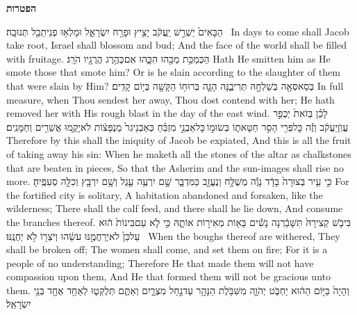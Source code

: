 \vspace{24pt}\LARGE \textbf{הפטרות} \normalsize\vspace{-16pt}
\label{haft_13}
\setcounter{chap}{27}
\setcounter{verse}{6}
{הַבָּאִים֙ יַשְׁרֵ֣שׁ יַֽעֲקֹ֔ב יָצִ֥יץ וּפָרַ֖ח יִשְׂרָאֵ֑ל וּמָלְא֥וּ פְנֵי\maqqaf תֵבֵ֖ל תְּנוּבָֽה׃ \petucha }
{In days to come shall Jacob take root, Israel shall blossom and bud; And the face of the world shall be filled with fruitage.}
{הַכְּמַכַּ֥ת מַכֵּ֖הוּ הִכָּ֑הוּ אִם\maqqaf כְּהֶ֥רֶג הֲרֻגָ֖יו הֹרָֽג׃}
{Hath He smitten him as He smote those that smote him? Or is he slain according to the slaughter of them that were slain by Him?}
{בְּסַאסְּאָ֖ה בְּשַׁלְחָ֣הּ תְּרִיבֶ֑נָּה הָגָ֛ה בְּרוּח֥וֹ הַקָּשָׁ֖ה בְּי֥וֹם קָדִֽים׃}
{In full measure, when Thou sendest her away, Thou dost contend with her; He hath removed her with His rough blast in the day of the east wind.}
{לָכֵ֗ן בְּזֹאת֙ יְכֻפַּ֣ר עֲוֺֽן\maqqaf יַעֲקֹ֔ב וְזֶ֕ה כׇּל\maqqaf פְּרִ֖י הָסִ֣ר חַטָּאת֑וֹ בְּשׂוּמ֣וֹ \legarmeh  כׇּל\maqqaf אַבְנֵ֣י מִזְבֵּ֗חַ כְּאַבְנֵי\maqqaf גִר֙ מְנֻפָּצ֔וֹת לֹא\maqqaf יָקֻ֥מוּ אֲשֵׁרִ֖ים וְחַמָּנִֽים׃}
{Therefore by this shall the iniquity of Jacob be expiated, And this is all the fruit of taking away his sin: When he maketh all the stones of the altar as chalkstones that are beaten in pieces, So that the Asherim and the sun-images shall rise no more.}
{כִּ֣י עִ֤יר בְּצוּרָה֙ בָּדָ֔ד נָוֶ֕ה מְשֻׁלָּ֥ח וְנֶעֱזָ֖ב כַּמִּדְבָּ֑ר שָׁ֣ם יִרְעֶ֥ה עֵ֛גֶל וְשָׁ֥ם יִרְבָּ֖ץ וְכִלָּ֥ה סְעִפֶֽיהָ׃}
{For the fortified city is solitary, A habitation abandoned and forsaken, like the wilderness; There shall the calf feed, and there shall he lie down, And consume the branches thereof.}
{בִּיבֹ֤שׁ קְצִירָהּ֙ תִּשָּׁבַ֔רְנָה נָשִׁ֕ים בָּא֖וֹת מְאִיר֣וֹת אוֹתָ֑הּ כִּ֣י לֹ֤א עַם\maqqaf בִּינוֹת֙ ה֔וּא עַל\maqqaf כֵּן֙ לֹא\maqqaf יְרַחֲמֶ֣נּוּ עֹשֵׂ֔הוּ וְיֹצְר֖וֹ לֹ֥א יְחֻנֶּֽנּוּ׃ \petucha }
{When the boughs thereof are withered, They shall be broken off; The women shall come, and set them on fire; For it is a people of no understanding; Therefore He that made them will not have compassion upon them, And He that formed them will not be gracious unto them.}
{וְהָיָה֙ בַּיּ֣וֹם הַה֔וּא יַחְבֹּ֧ט יְהֹוָ֛ה מִשִּׁבֹּ֥לֶת הַנָּהָ֖ר עַד\maqqaf נַ֣חַל מִצְרָ֑יִם וְאַתֶּ֧ם תְּלֻקְּט֛וּ לְאַחַ֥ד אֶחָ֖ד בְּנֵ֥י יִשְׂרָאֵֽל׃ \petucha }
